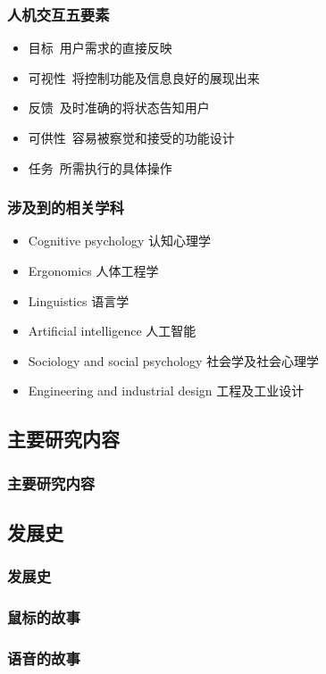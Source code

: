 \documentclass{beamer}
\begin{document}
\begin{frame}
	\frametitle{人机交互五要素}
	\begin{itemize}
		\item 目标~{\small 用户需求的直接反映}
		\item 可视性~{\small 将控制功能及信息良好的展现出来}
		\item 反馈~{\small 及时准确的将状态告知用户}
		\item 可供性~{\small 容易被察觉和接受的功能设计}
		\item 任务~{\small 所需执行的具体操作}
	\end{itemize}
\end{frame}

\begin{frame}
	\frametitle{涉及到的相关学科}
	\begin{itemize}
		\item Cognitive psychology 认知心理学
		\item Ergonomics 人体工程学
		\item Linguistics 语言学
		\item Artificial intelligence 人工智能
		\item Sociology and social psychology 社会学及社会心理学
		\item Engineering and industrial design 工程及工业设计
	\end{itemize}
\end{frame}

\subsection{主要研究内容}
\begin{frame}
	\frametitle{主要研究内容}

\end{frame}

\subsection{发展史}
\begin{frame}
	\frametitle{发展史}

\end{frame}

\begin{frame}
	\frametitle{鼠标的故事}

\end{frame}

\begin{frame}
	\frametitle{语音的故事}

\end{frame}
\end{document}

